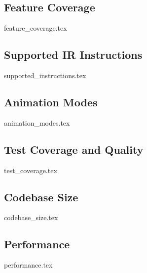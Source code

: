 \subsection{Feature Coverage}
\label{sec:results:feature_coverage}
{feature_coverage.tex}

\subsection{Supported IR Instructions}
\label{sec:results:supported_instructions}
{supported_instructions.tex}

\subsection{Animation Modes}
\label{sec:results:animation_modes}
{animation_modes.tex}

\subsection{Test Coverage and Quality}
\label{sec:results:test_coverage}
{test_coverage.tex}


\subsection{Codebase Size}
\label{sec:results:codebase_size}
{codebase_size.tex}

\subsection{Performance}
\label{sec:results:performance}
{performance.tex}
